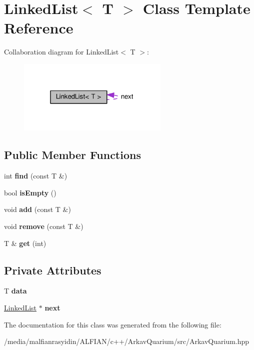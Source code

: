 \hypertarget{class_linked_list}{}\section{Linked\+List$<$ T $>$ Class Template Reference}
\label{class_linked_list}


Collaboration diagram for Linked\+List$<$ T $>$\+:\nopagebreak
\begin{figure}[H]
\begin{center}
\leavevmode
\includegraphics[width=205pt]{class_linked_list__coll__graph}
\end{center}
\end{figure}
\subsection*{Public Member Functions}
\begin{DoxyCompactItemize}
\item 
\mbox{\label{class_linked_list_a504682d439241a3fbc1015bc0ededcca}} 
int {\bfseries find} (const T \&)
\item 
\mbox{\label{class_linked_list_a7ecbb28e82117a680839ed0dc28ebdce}} 
bool {\bfseries is\+Empty} ()
\item 
\mbox{\label{class_linked_list_a0619bf53ad7570a59a929ffe08693a92}} 
void {\bfseries add} (const T \&)
\item 
\mbox{\label{class_linked_list_a6cdffc5e78280f2e754b61d03daddf50}} 
void {\bfseries remove} (const T \&)
\item 
\mbox{\label{class_linked_list_a4f89f0bf2f24aff824a61739a7105071}} 
T \& {\bfseries get} (int)
\end{DoxyCompactItemize}
\subsection*{Private Attributes}
\begin{DoxyCompactItemize}
\item 
\mbox{\label{class_linked_list_ae0e1e4dbae6558e14216ec3e6cf9ad64}} 
T {\bfseries data}
\item 
\mbox{\label{class_linked_list_a33d07a25128dbea590f9cd758241a41f}} 
\mbox{\hyperlink{class_linked_list}{Linked\+List}} $\ast$ {\bfseries next}
\end{DoxyCompactItemize}


The documentation for this class was generated from the following file\+:\begin{DoxyCompactItemize}
\item 
/media/malfianrasyidin/\+A\+L\+F\+I\+A\+N/c++/\+Arkav\+Quarium/src/Arkav\+Quarium.\+hpp\end{DoxyCompactItemize}
